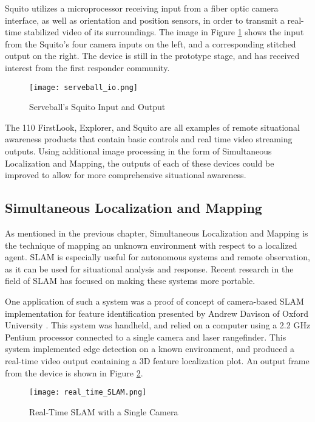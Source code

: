 Squito utilizes a microprocessor receiving input from a fiber optic camera interface, as well as orientation and position sensors, in order to transmit a real-time stabilized video of its surroundings. The image in Figure \ref{squito_io} shows the input from the Squito's four camera inputs on the left, and a corresponding stitched output on the right. The device is still in the prototype stage, and has received interest from the first responder community. 
\par
\begin{figure}[H]
	\centerline{\texttt{[image: serveball\_io.png]}}
	\caption{Serveball's Squito Input and Output \cite{serveball}}
	\label{squito_io}
\end{figure}
\par
The 110 FirstLook, Explorer, and Squito are all examples of remote situational awareness products that contain basic controls and real time video streaming outputs. Using additional image processing in the form of Simultaneous Localization and Mapping, the outputs of each of these devices could be improved to allow for more comprehensive situational awareness. 

\subsection{Simultaneous Localization and Mapping}
As mentioned in the previous chapter, Simultaneous Localization and Mapping is the technique of mapping an unknown environment with respect to a localized agent. SLAM is especially useful for autonomous systems and remote observation, as it can be used for situational analysis and response. Recent research in the field of SLAM has focused on making these systems more portable.
\par
One application of such a system was a proof of concept of camera-based SLAM implementation for feature identification presented by Andrew Davison of Oxford University \cite{davison}. This system was handheld, and relied on a computer using a 2.2 GHz Pentium processor connected to a single camera and laser rangefinder. This system implemented edge detection on a known environment, and produced a real-time video output containing a 3D feature localization plot. An output frame from the device is shown in Figure \ref{rtSLAM}.

\begin{figure}[H]
	\centerline{\texttt{[image: real\_time\_SLAM.png]}}
	\caption{Real-Time SLAM with a Single Camera \cite{davison}}
	\label{rtSLAM}
\end{figure}

